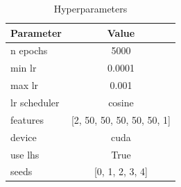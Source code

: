 \begin{table}[H]
    \centering
    \caption{Hyperparameters}
    \label{tab:hyper_params}
    \begin{tabular}{lc}
        \toprule
        \textbf{Parameter} & \textbf{Value} \\
        \midrule
        n epochs & 5000 \\
        min lr & 0.0001 \\
        max lr & 0.001 \\
        lr scheduler & cosine \\
        features & [2, 50, 50, 50, 50, 50, 1] \\
        device & cuda \\
        use lhs & True \\
        seeds & [0, 1, 2, 3, 4] \\
        \bottomrule
    \end{tabular}
\end{table}
